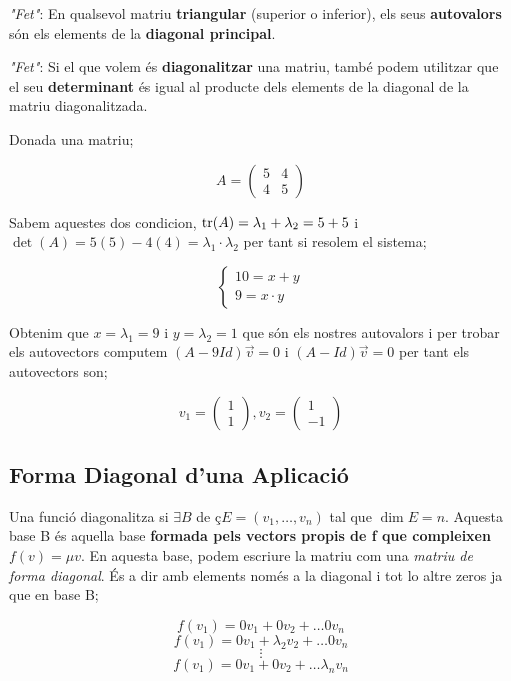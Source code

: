 \documentclass[12pt]{article}
\begin{document}
\textit{"Fet"}: En qualsevol matriu \textbf{triangular} (superior o inferior), els seus \textbf{autovalors} són els elements de la \textbf{diagonal principal}.

\textit{"Fet"}: Si el que volem és \textbf{diagonalitzar} una matriu, també podem utilitzar que el seu \textbf{determinant} és igual al producte dels elements de la diagonal de la matriu diagonalitzada.

\begin{examplebox}{}
    Donada una matriu;

    \[A = \begin{pmatrix}
        5 & 4\\
        4 & 5
    \end{pmatrix}\]

    Sabem aquestes dos condicion, $ \tr(A) = \lambda_1 + \lambda_2 = 5 + 5$ i $\det(A) = 5(5) - 4(4) = \lambda_1 \cdot \lambda_2 $ per tant si resolem el sistema;

    \[
\begin{cases}
10 = x+y\\
9 = x\cdot y
\end{cases}
\]

Obtenim que $x = \lambda_1 = 9 $ i $y = \lambda_2 = 1$ que són els nostres autovalors i per trobar els autovectors computem $(A - 9Id)\vec{v} = 0$ i $(A - Id)\vec{v} = 0$ per tant els autovectors son;

\[v_1 = \begin{pmatrix}
    1\\
    1
\end{pmatrix}, v_2 = \begin{pmatrix}
    1\\
    -1
\end{pmatrix}\]
\end{examplebox}

\subsection{Forma Diagonal d'una Aplicació}

Una funció diagonalitza si $\exists B$ de ç$E = (v_1, \dots, v_n)$ tal que $\dim E = n$. Aquesta base B és aquella base \textbf{formada pels vectors propis de f que compleixen} $f(v) = \mu v$. En aquesta base, podem escriure la matriu com una \textit{matriu de forma diagonal}. És a dir amb elements només a la diagonal i tot lo altre zeros ja que en base B;

\[f(v_1) = 0v_1 + 0 v_2 + \dots 0 v_n\]
\[f(v_1) = 0 v_1 + \lambda_2 v_2 + \dots 0 v_n\]
\[\vdots\]
\[f(v_1) = 0 v_1 + 0 v_2 + \dots \lambda_n v_n\]
\end{document}
